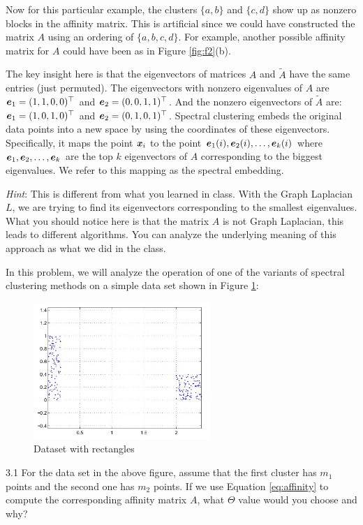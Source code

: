 \documentclass{article}
\begin{document}
Now for this particular example, the clusters $\{a, b\}$ and $\{c, d\}$ show up as nonzero blocks in the affinity matrix. This is artificial since we could have constructed the matrix $A$ using an ordering of $\{a, b, c, d\}$. For example, another possible affinity matrix for $A$ could have been as in Figure \ref{fig:f2}(b).

The key insight here is that the eigenvectors of matrices $A$ and $\tilde{A}$ have the same entries (just permuted). The eigenvectors with nonzero eigenvalues of $A$ are $\bm{e}_{1}=(1, 1, 0, 0)^\top$ and $\bm{e}_{2}=(0, 0, 1, 1)^\top$. And the nonzero eigenvectors of $\tilde{A}$ are: $\bm{e}_{1}=(1, 0, 1, 0)^\top$ and $\bm{e}_{2}=(0, 1, 0, 1)^\top$. Spectral clustering embeds the original data points into a new space by using the coordinates of these eigenvectors. Specifically, it maps the point $\bm{x}_{i}$ to the point $\bm{e}_{1}(i), \bm{e}_{2}(i),\dots, \bm{e}_{k}(i)$ where $\bm{e}_{1},\bm{e}_{2},\dots, \bm{e}_{k}$ are the top $k$ eigenvectors of $A$ corresponding to the biggest eigenvalues. We refer to this mapping as the spectral embedding.

\emph{Hint}: This is different from what you learned in class. With the Graph Laplacian $L$, we are trying to find its eigenvectors corresponding to the smallest eigenvalues. What you should notice here is that the matrix $A$ is not Graph Laplacian, this leads to different algorithms. You can analyze the underlying meaning of this approach as what we did in the class.

In this problem, we will analyze the operation of one of the variants of spectral clustering methods on a simple data set shown in Figure \ref{fig:f3}:
 \begin{figure}[ht]
  \centering
  \includegraphics[width=0.6\textwidth]{rec_dataset.jpg}
  \caption{Dataset with rectangles} 
  \label{fig:f3}
\end{figure}

3.1 For the data set in the above figure, assume that the first cluster has $m_{1}$ points and the second one has $m_{2}$ points. If we use Equation \ref{eq:affinity} to compute the corresponding affinity matrix $A$, what $\Theta$ value would you choose and why?
\end{document}
